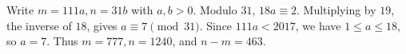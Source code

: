Write $m=111a,n=31b$ with $a,b>0$. Modulo $31$, $18a\equiv2$. Multiplying by $19$, the inverse of $18$, gives $a\equiv7\pmod{31}$. Since $111a<2017$, we have $1\le a\le18$, so $a=7$. Thus $m=777,n=1240$, and $\boxed{n-m=463}$.
